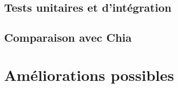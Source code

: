 \subsection{Tests unitaires et d'intégration}

\subsection{Comparaison avec Chia}

\section{Améliorations possibles}

\lipsum[1]